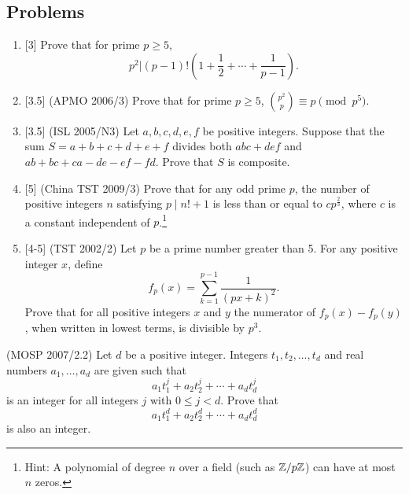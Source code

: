 \subsection{Problems}
\begin{enumerate}
\item{} [3] Prove that for prime $p\geq 5$,
\[p^2|(p-1)!\left(1+\frac{1}{2}+\cdots +\frac{1}{p-1}\right).\]

\item{} [3.5] (APMO 2006/3) Prove that for prime $p\geq 5$, $\binom{p^2}{p}\equiv p \pmod{p^5}$.

\item{} [3.5] (ISL 2005/N3) Let $a,b,c,d,e,f$ be positive integers. Suppose that the sum $S=a+b+c+d+e+f$ divides both $abc+def$ and $ab+bc+ca-de-ef-fd$. Prove that $S$ is composite.

\item{} [5] (China TST 2009/3) Prove that for any odd prime $p$, the number of positive integers $n$ satisfying $p\mid n!+1$ is less than or equal to $cp^{\frac{2}{3}}$, where $c$ is a constant independent of $p$.\footnote{Hint: A polynomial of degree $n$ over a field (such as $\mathbb{Z}/p\mathbb{Z}$) can have at most $n$ zeros.}

\item{} [4-5] (TST 2002/2) Let $p$ be a prime number greater than 5. For any positive integer $x$, define
\[f_p(x)=\sum_{k=1}^{p-1}\frac{1}{(px+k)^2}.\]
Prove that for all positive integers $x$ and $y$ the numerator of $f_p(x)-f_p(y)$, when written in lowest terms, is divisible by $p^3$.
\end{enumerate}
(MOSP 2007/2.2) Let $d$ be a positive integer. Integers $t_1,t_2,\ldots, t_d$ and real numbers $a_1,\ldots, a_d$ are given such that
\[
a_1t_1^j+a_2t_2^j+\cdots +a_dt_d^j
\]
is an integer for all integers $j$ with $0\le j<d$. Prove that
\[
a_1t_1^d+a_2t_2^d+\cdots +a_dt_d^d
\]
is also an integer.
